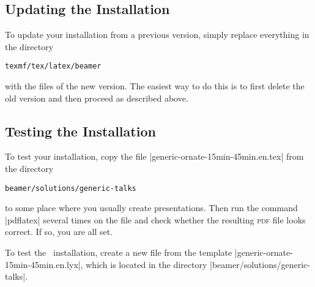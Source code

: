\subsection{Updating the Installation}

To update your installation from a previous version, simply replace
everything in the directory
\begin{verbatim}
texmf/tex/latex/beamer
\end{verbatim}
with the files of the new version. The easiest way to do this is to
first delete the old version and then proceed as described above.


\subsection{Testing the Installation}

To test your installation, copy the file
|generic-ornate-15min-45min.en.tex| from the directory
\begin{verbatim}
beamer/solutions/generic-talks
\end{verbatim}
to some place where you usually
create presentations. Then run the command |pdflatex| several times on
the file and check whether the resulting \textsc{pdf} file looks
correct. If so, you are all set. 

\lyxnote
To test the \LyX\ installation, create a new file from the
template |generic-ornate-15min-45min.en.lyx|, which is located in the directory
|beamer/solutions/generic-talks|.




